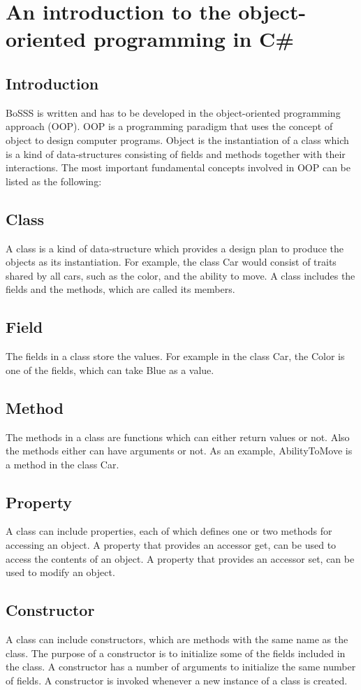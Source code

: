 \documentclass[11pt,twoside,a4paper]{fdyartcl}
\begin{document}
\section{An introduction to the object-oriented programming in C\#}
\subsection{Introduction}
BoSSS is written and has to be developed in the object-oriented programming approach (OOP). OOP is a programming paradigm that uses the concept of object to design computer programs. Object is the instantiation of a class which is a kind of data-structures consisting of fields and methods together with their interactions. The most important fundamental concepts involved in OOP can be listed as the following:
\subsection{Class}
A class is a kind of data-structure which provides a design plan to produce the objects as its instantiation. For example, the class {\scriptsize Car} would consist of traits shared by all cars, such as the color, and the ability to move. A class includes the fields and the methods, which are called its members.
\subsection{Field}
The fields in a class store the values. For example in the class {\scriptsize Car}, the {\scriptsize Color} is one of the fields, which can take {\scriptsize Blue} as a value.
\subsection{Method}
The methods in a class are functions which can either return values or not. Also the methods either can have arguments or not. As an example, {\scriptsize AbilityToMove} is a method in the class {\scriptsize Car}.
\subsection{Property}
A class can include properties, each of which defines one or two methods for accessing an object. A property that provides an accessor {\scriptsize get}, can be used to access the contents of an object. A property that provides an accessor {\scriptsize set}, can be used to modify an object.
\subsection{Constructor}
A class can include constructors, which are methods with the same name as the class. The purpose of a constructor is to initialize some of the fields included in the class. A constructor has a number of arguments to initialize the same number of fields. A constructor is invoked whenever a new instance of a class is created.
\end{document}
